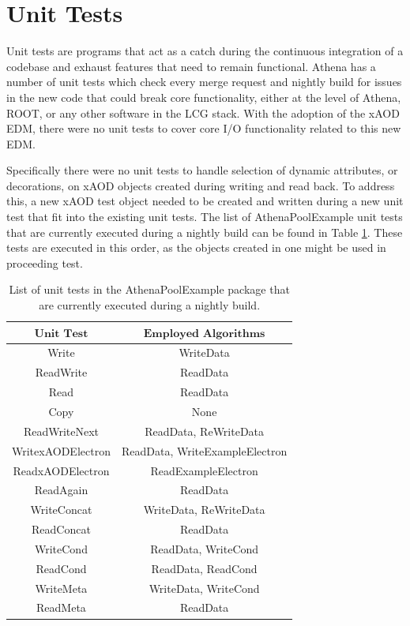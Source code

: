 \section{Unit Tests}
\label{sec:Mod_utests_CI}
Unit tests are programs that act as a catch during the continuous integration of a codebase and exhaust features that need to remain functional. 
Athena has a number of unit tests which check every merge request and nightly build for issues in the new code that could break core functionality, either at the level of Athena, ROOT, or any other software in the LCG stack.
With the adoption of the xAOD EDM, there were no unit tests to cover core I/O functionality related to this new EDM. 

Specifically there were no unit tests to handle selection of dynamic attributes, or decorations, on xAOD objects created during writing and read back.
To address this, a new xAOD test object needed to be created and written during a new unit test that fit into the existing unit tests.
The list of AthenaPoolExample unit tests that are currently executed during a nightly build can be found in Table \ref{tab:CI_Unit_Tests}.
These tests are executed in this order, as the objects created in one might be used in proceeding test.

\begin{table}[h]
    \centering
    \begin{tabular}{|c|c|}
        \hline
        $\textbf{Unit Test}$ & $\textbf{Employed Algorithms}$ \\
        \hline
        Write & WriteData \\
        \hline
        ReadWrite & ReadData \\
        \hline
        Read & ReadData \\
        \hline
        Copy & None \\
        \hline
        ReadWriteNext & ReadData, ReWriteData \\
        \hline
        WritexAODElectron & ReadData, WriteExampleElectron \\
        \hline
        ReadxAODElectron & ReadExampleElectron \\
        \hline
        ReadAgain & ReadData \\
        \hline
        WriteConcat & WriteData, ReWriteData \\
        \hline
        ReadConcat & ReadData \\
        \hline
        WriteCond & ReadData, WriteCond \\
        \hline
        ReadCond & ReadData, ReadCond \\
        \hline
        WriteMeta & WriteData, WriteCond \\
        \hline
        ReadMeta & ReadData \\
        \hline
    \end{tabular}
    \caption{List of unit tests in the AthenaPoolExample package that are currently executed during a nightly build.}
    \label{tab:CI_Unit_Tests}
\end{table}

